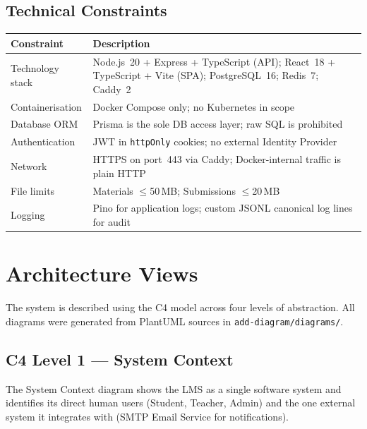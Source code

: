 \documentclass[12pt,a4paper]{article}
\begin{document}
\subsection{Technical Constraints}

\begin{tabularx}{\textwidth}{L{3.5cm} L{10cm}}
  \toprule
  \textbf{Constraint} & \textbf{Description} \\
  \midrule
  Technology stack & Node.js~20 + Express + TypeScript (API); React~18 + TypeScript + Vite (SPA); PostgreSQL~16; Redis~7; Caddy~2 \\
  Containerisation & Docker Compose only; no Kubernetes in scope \\
  Database ORM & Prisma is the sole DB access layer; raw SQL is prohibited \\
  Authentication & JWT in \texttt{httpOnly} cookies; no external Identity Provider \\
  Network & HTTPS on port~443 via Caddy; Docker-internal traffic is plain HTTP \\
  File limits & Materials $\leq$50\,MB; Submissions $\leq$20\,MB \\
  Logging & Pino for application logs; custom JSONL canonical log lines for audit \\
  \bottomrule
\end{tabularx}

\section{Architecture Views}
\label{sec:views}

The system is described using the C4 model across four levels of abstraction.
All diagrams were generated from PlantUML sources in \texttt{add-diagram/diagrams/}.

\subsection{C4 Level 1 --- System Context}

The System Context diagram shows the LMS as a single software system and identifies its
direct human users (Student, Teacher, Admin) and the one external system it integrates with
(SMTP Email Service for notifications).
\end{document}

